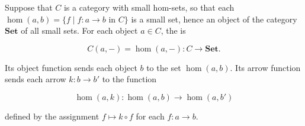 Suppose that $C$ is a category with small hom-sets, so that each $\hom(a, b) = \{f \mid f: a \to b \text{ in } C\}$ is a small set, hence an object of the category $\mathbf{Set}$ of all small sets. For each object $a \in C$, the  is

$$
C(a, -) = \hom(a, -): C \to \mathbf{Set}.
$$

Its object function sends each object $b$ to the set $\hom(a, b)$. Its arrow function sends each arrow $k: b \to b'$ to the function

$$
\hom(a, k): \hom(a, b) \to \hom(a, b')
$$

defined by the assignment $f \mapsto k \circ f$ for each $f: a \to b$.
